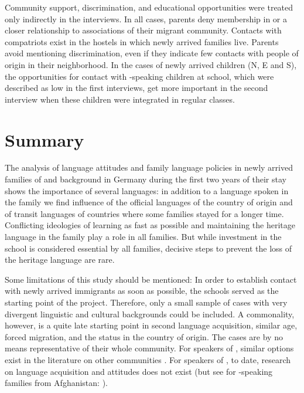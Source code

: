 \documentclass[output=paper,colorlinks,citecolor=brown]{langscibook}
\begin{document}
Community support, discrimination, and educational opportunities were treated only indirectly in the interviews. In all cases, parents deny membership in or a closer relationship to associations of their migrant community. Contacts with compatriots exist in the hostels in which newly arrived families live. Parents avoid mentioning discrimination, even if they indicate few contacts with people of  origin in their neighborhood. In the cases of newly arrived children (N, E and S), the opportunities for contact with -speaking children at school, which were described as low in the first interviews, get more important in the second interview when these children were integrated in regular classes. 

\section{Summary}\label{ch2.5.ss.5}

The analysis of language attitudes and family language policies in newly arrived families of  and  background in Germany during the first two years of their stay shows the importance of several languages: in addition to a  language spoken in the family we find influence of the official languages of the country of origin and of transit languages of countries where some families stayed for a longer time. Conflicting ideologies of learning  as fast as possible and maintaining the heritage language in the family play a role in all families. But while investment in the  school is considered essential by all families, decisive steps to prevent the loss of the heritage language are rare.

Some limitations of this study should be mentioned: In order to establish contact with newly arrived immigrants as soon as possible, the  schools served as the starting point of the project. Therefore, only a small sample of cases with very divergent linguistic and cultural backgrounds could be included. A commonality, however, is a quite late starting point in second language acquisition, similar age, forced migration, and the  status in the country of origin. The cases are by no means representative of their whole community. For speakers of , similar options exist in the literature on other communities \citep{brizic2021}. For speakers of , to date, research on language acquisition and attitudes does not exist (but see for -speaking families from Afghanistan: \citealt{panagiotopoulou_uca2023_dynamic,panagiotopoulou_uca_samani2023}).
\end{document}
